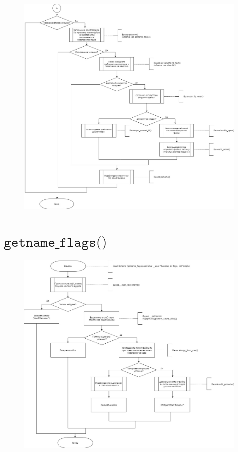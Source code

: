 \documentclass[a4paper,14pt]{extreport}
\begin{document}
\begin{figure}[H]
	\centering
	\includegraphics[scale=0.4]{img/open2.jpg}
\end{figure}








\section{$\texttt{getname\_flags()}$}

\begin{figure}[H]
	\centering
	\includegraphics[scale=0.4]{img/getname_flags.jpg}
	\label{fig:get_name_flags}
\end{figure}
\end{document}

